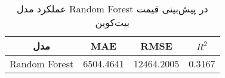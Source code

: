 
        \begin{table}[h]
            \centering
            \begin{tabular}{cccc}
                \toprule
                \textbf{مدل} & \textbf{MAE} & \textbf{RMSE} & \textbf{ \(R^2\) } \\
                \midrule
                Random Forest & 6504.4641 & 12464.2005 & 0.3167 \\
                \bottomrule
            \end{tabular}
            \caption{عملکرد مدل Random Forest در پیش‌بینی قیمت بیت‌کوین}
            \label{tab:random_forest_performance}
        \end{table}
        